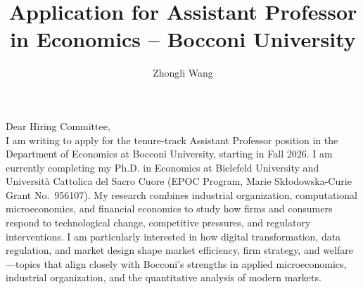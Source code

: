 \documentclass{nfr}
\title{Application for Assistant Professor in Economics – Bocconi University}
\author{Zhongli Wang}
\begin{document}

% 
% 
% 
% 


\maketitle


\noindent Dear Hiring Committee,\\[0.2cm]

I am writing to apply for the tenure-track Assistant Professor position in the Department of Economics at Bocconi University, starting in Fall 2026. 
I am currently completing my Ph.D. in Economics at Bielefeld University and Università Cattolica del Sacro Cuore (EPOC Program, Marie Skłodowska-Curie Grant No.~956107). 
My research combines industrial organization, computational microeconomics, and financial economics to study how firms and consumers respond to technological change, competitive pressures, and regulatory interventions. 
I am particularly interested in how digital transformation, data regulation, and market design shape market efficiency, firm strategy, and welfare—topics that align closely with Bocconi’s strengths in applied microeconomics, industrial organization, and the quantitative analysis of modern markets.\\
\end{document}
